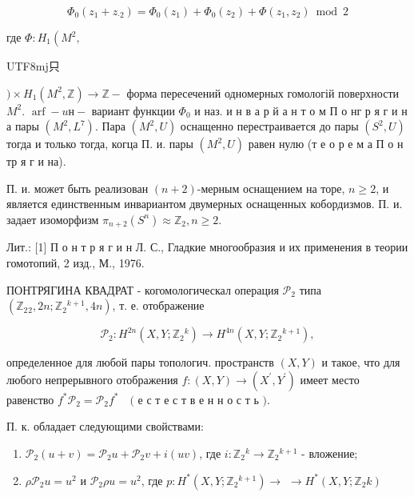 \documentclass[10pt]{article}
\begin{document}
\[

\Phi_{0}\left(z_{1}+z_{\cdot 2}\right)=\Phi_{0}\left(z_{1}\right)+\Phi_{0}\left(z_{2}\right)+\Phi\left(z_{1}, z_{2}\right) \bmod 2

\]



где $\Phi: H_{1}\left(M^{2}, \quad\right.$ \begin{CJK}{UTF8}{mj}只\end{CJK} $) \times H_{1}\left(M^{2}, \mathbb{Z}\right) \rightarrow \mathbb{Z}-$ форма пересечений одномерных гомологій поверхности $M^{2}$. $\operatorname{arf}-u н-$ вариант функции $\Phi_{0}$ и наз. и н в а р й а н т о м П о нг р я г и н а пары $\left(M^{2}, L^{7}\right)$. Пара $\left(M^{2}, U\right)$ оснащенно перестраивается до пары $\left(S^{2}, U\right)$ тогда и только тогда, когца П. и. пары $\left(M^{2}, U\right)$ равен нулю (т е о р е м а П о н тр я г и на).



П. и. может быть реализован $(n+2)$-мерным оснащением на торе, $n \geqslant 2$, и является единственным инвариантом двумерных оснащенных кобордизмов. П. и. задает изоморфизм $\pi_{n+2}\left(S^{n}\right) \approx \mathbb{Z}_{2}, n \geqslant 2$.



Лит.: [1] П о н т р я г и н Л. С., Гладкие многообразия и их применения в теории гомотопий, 2 изд., М., 1976.



ПОНТРЯГИНА КВАДРАТ - когомологическал операция $\mathscr{P}_{2}$ типа $\left(\mathbb{Z}_{2}{ }_{2}, 2 n ; \mathbb{Z}_{2}{ }^{k+1}, 4 n\right)$, т. е. отображение



\[

\mathscr{P}_{2}: H^{2 n}\left(X, Y ; \mathbb{Z}_{2}{ }^{k}\right) \longrightarrow H^{4 n}\left(X, Y ; \mathbb{Z}_{2}{ }^{k+1}\right),

\]



определенное для любой пары топологич. пространств $(X, Y)$ и такое, что для любого непрерывного отображения $f:(X, Y) \rightarrow\left(X^{\prime}, Y^{\prime}\right)$ имеет место равенство $f^{*} \mathscr{P}_{2}=\mathscr{P}_{2} f^{*} \quad($ е с т е с т в е н н о с т ь $)$.



П. к. обладает следующими свойствами:



\begin{enumerate}

  \item $\mathscr{P}_{2}(u+v)=\mathscr{P}_{2} u+\mathscr{P}_{2} v+i(u v)$, где $i: \mathbb{Z}_{2}{ }^{k} \longrightarrow \mathbb{Z}_{2}{ }^{k+1}$ - вложение;



  \item $\rho \mathscr{P}_{2} u=u^{2}$ и $\mathscr{P}_{2} \rho u=u^{2}$, где $p: H^{*}\left(X, Y ; \mathbb{Z}_{2}{ }^{k+1}\right) \longrightarrow$ $\longrightarrow H^{*}\left(X, Y ; \mathbb{Z}_{2} k\right)$



\end{enumerate}
\end{document}
